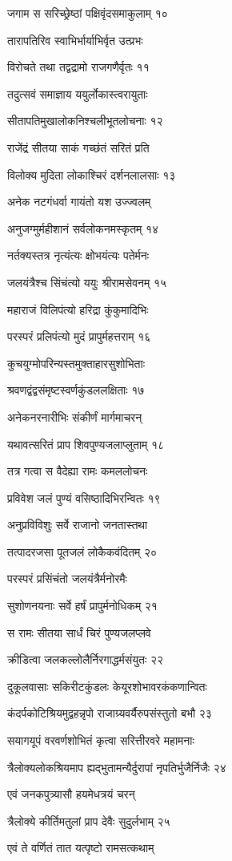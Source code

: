 जगाम स सरिच्छ्रेष्ठां पक्षिवृंदसमाकुलाम् १०

तारापतिरिव स्वाभिर्भार्याभिर्वृत उत्प्रभः

विरोचते तथा तद्वद्रामो राजगणैर्वृतः ११

तदुत्सवं समाज्ञाय ययुर्लोकास्त्वरायुताः

सीतापतिमुखालोकनिश्चलीभूतलोचनाः १२

राजेंद्रं सीतया साकं गच्छंतं सरितं प्रति

विलोक्य मुदिता लोकाश्चिरं दर्शनलालसाः १३

अनेक नटगंधर्वा गायंतो यश उज्ज्वलम्

अनुजग्मुर्महीशानं सर्वलोकनमस्कृतम् १४

नर्तक्यस्तत्र नृत्यंत्यः क्षोभयंत्यः पतेर्मनः

जलयंत्रैश्च सिंचंत्यो ययुः श्रीरामसेवनम् १५

महाराजं विलिपंत्यो हरिद्रा कुंकुमादिभिः

परस्परं प्रलिपंत्यो मुदं प्रापुर्महत्तराम् १६

कुचयुग्मोपरिन्यस्तमुक्ताहारसुशोभिताः

श्रवणद्वंद्वसंमृष्टस्वर्णकुंडललक्षिताः १७

अनेकनरनारीभिः संकीर्णं मार्गमाचरन्

यथावत्सरितं प्राप शिवपुण्यजलाप्लुताम् १८

तत्र गत्वा स वैदेह्या रामः कमललोचनः

प्रविवेश जलं पुण्यं वसिष्ठादिभिरन्वितः १९

अनुप्रविविशुः सर्वे राजानो जनतास्तथा

तत्पादरजसा पूतजलं लोकैकवंदितम् २०

परस्परं प्रसिंचंतो जलयंत्रैर्मनोरमैः

सुशोणनयनाः सर्वे हर्षं प्रापुर्मनोधिकम् २१

स रामः सीतया सार्धं चिरं पुण्यजलप्लवे

क्रीडित्वा जलकल्लोलैर्निरगाद्धर्मसंयुतः २२

दुकूलवासाः सकिरीटकुंडलः केयूरशोभावरकंकणान्वितः

कंदर्पकोटिश्रियमुद्वहन्नृपो राजाग्र्यवर्यैरुपसंस्तुतो बभौ २३

सयागयूपं वरवर्णशोभितं कृत्वा सरित्तीरवरे महामनाः

त्रैलोक्यलोकश्रियमाप ह्यद्भुतामन्यैर्दुरापां नृपतिर्भुजैर्निजैः २४

एवं जनकपुत्र्यासौ हयमेधत्रयं चरन्

त्रैलोक्ये कीर्तिमतुलां प्राप देवैः सुदुर्लभाम् २५

एवं ते वर्णितं तात यत्पृष्टो रामसत्कथाम्

